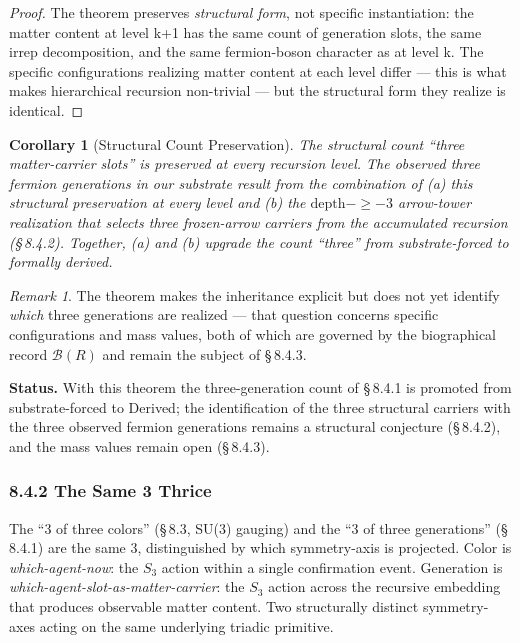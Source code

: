 \documentclass[11pt,oneside]{report}
\newtheorem{corollary}[theorem]{Corollary}
\theoremstyle{definition}
\theoremstyle{remark}
\newtheorem{remark}[theorem]{Remark}
\begin{document}
\begin{proof}
The theorem preserves \emph{structural form}, not specific
instantiation: the matter content at level k+1 has the same count of
generation slots, the same irrep decomposition, and the same
fermion-boson character as at level k. The specific configurations
realizing matter content at each level differ --- this is what makes
hierarchical recursion non-trivial --- but the structural form they
realize is identical.

\end{proof}

\begin{corollary}[Structural Count Preservation]
The structural
count ``three matter-carrier slots'' is preserved at every recursion
level. The observed three fermion generations in our substrate result
from the combination of (a) this structural preservation at every level
and (b) the \ensuremath{\text{depth}-\geq -3} arrow-tower realization that selects three
frozen-arrow carriers from the accumulated recursion (\S\,8.4.2). Together,
(a) and (b) upgrade the count ``three'' from substrate-forced to
formally derived.
\end{corollary}

\begin{remark}
The theorem makes the inheritance explicit but does not
yet identify \emph{which} three generations are realized --- that
question concerns specific configurations and mass values, both of which
are governed by the biographical record \ensuremath{\mathcal{B}(R)} and remain the subject of
\S\,8.4.3.
\end{remark}

\textbf{Status.} With this theorem the three-generation count of \S\,8.4.1
is promoted from substrate-forced to Derived; the identification of the
three structural carriers with the three observed fermion generations
remains a structural conjecture (\S\,8.4.2), and the mass values remain
open (\S\,8.4.3).

\subsubsection*{8.4.2 The Same 3 Thrice}

The ``3 of three colors'' (\S\,8.3, SU(3) gauging) and the ``3 of three
generations'' (\S\,8.4.1) are the same 3, distinguished by which
symmetry-axis is projected. Color is \emph{which-agent-now}: the \ensuremath{S_{3}}
action within a single confirmation event. Generation is
\emph{which-agent-slot-as-matter-carrier}: the \ensuremath{S_{3}} action across the
recursive embedding that produces observable matter content. Two
structurally distinct symmetry-axes acting on the same underlying
triadic primitive.
\end{document}
